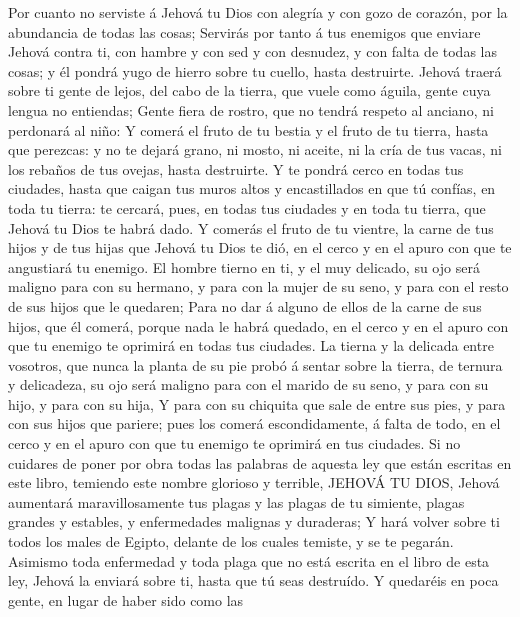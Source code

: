 Por cuanto no serviste á Jehová tu Dios con alegría y con
gozo de corazón, por la abundancia de todas las cosas; 
Servirás por tanto á tus enemigos que enviare Jehová contra ti, con
hambre y con sed y con desnudez, y con falta de todas las cosas; y él
pondrá yugo de hierro sobre tu cuello, hasta destruirte. 
Jehová traerá sobre ti gente de lejos, del cabo de la tierra, que vuele
como águila, gente cuya lengua no entiendas;  Gente fiera
de rostro, que no tendrá respeto al anciano, ni perdonará al niño:
 Y comerá el fruto de tu bestia y el fruto de tu tierra,
hasta que perezcas: y no te dejará grano, ni mosto, ni aceite, ni la
cría de tus vacas, ni los rebaños de tus ovejas, hasta destruirte.
 Y te pondrá cerco en todas tus ciudades, hasta que caigan
tus muros altos y encastillados en que tú confías, en toda tu tierra: te
cercará, pues, en todas tus ciudades y en toda tu tierra, que Jehová tu
Dios te habrá dado.  Y comerás el fruto de tu vientre, la
carne de tus hijos y de tus hijas que Jehová tu Dios te dió, en el cerco
y en el apuro con que te angustiará tu enemigo.  El hombre
tierno en ti, y el muy delicado, su ojo será maligno para con su
hermano, y para con la mujer de su seno, y para con el resto de sus
hijos que le quedaren;  Para no dar á alguno de ellos de la
carne de sus hijos, que él comerá, porque nada le habrá quedado, en el
cerco y en el apuro con que tu enemigo te oprimirá en todas tus
ciudades.  La tierna y la delicada entre vosotros, que
nunca la planta de su pie probó á sentar sobre la tierra, de ternura y
delicadeza, su ojo será maligno para con el marido de su seno, y para
con su hijo, y para con su hija,  Y para con su chiquita
que sale de entre sus pies, y para con sus hijos que pariere; pues los
comerá escondidamente, á falta de todo, en el cerco y en el apuro con
que tu enemigo te oprimirá en tus ciudades.  Si no cuidares
de poner por obra todas las palabras de aquesta ley que están escritas
en este libro, temiendo este nombre glorioso y terrible, JEHOVÁ TU DIOS,
 Jehová aumentará maravillosamente tus plagas y las plagas
de tu simiente, plagas grandes y estables, y enfermedades malignas y
duraderas;  Y hará volver sobre ti todos los males de
Egipto, delante de los cuales temiste, y se te pegarán. 
Asimismo toda enfermedad y toda plaga que no está escrita en el libro de
esta ley, Jehová la enviará sobre ti, hasta que tú seas destruído.
 Y quedaréis en poca gente, en lugar de haber sido como las
